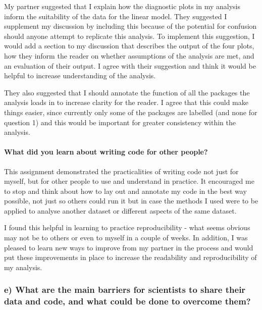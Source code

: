 \documentclass[
]{article}
\begin{document}
My partner suggested that I explain how the diagnostic plots in my
analysis inform the suitability of the data for the linear model. They
suggested I supplement my discussion by including this because of the
potential for confusion should anyone attempt to replicate this
analysis. To implement this suggestion, I would add a section to my
discussion that describes the output of the four plots, how they inform
the reader on whether assumptions of the analysis are met, and an
evaluation of their output. I agree with their suggestion and think it
would be helpful to increase understanding of the analysis.

They also suggested that I should annotate the function of all the
packages the analysis loads in to increase clarity for the reader. I
agree that this could make things easier, since currently only some of
the packages are labelled (and none for question 1) and this would be
important for greater consistency within the analysis.

\paragraph{What did you learn about writing code for other
people?}\label{what-did-you-learn-about-writing-code-for-other-people}

This assignment demonstrated the practicalities of writing code not just
for myself, but for other people to use and understand in practice. It
encouraged me to stop and think about how to lay out and annotate my
code in the best way possible, not just so others could run it but in
case the methods I used were to be applied to analyse another dataset or
different aspects of the same dataset.

I found this helpful in learning to practice reproducibility - what
seems obvious may not be to others or even to myself in a couple of
weeks. In addition, I was pleased to learn new ways to improve from my
partner in the process and would put these improvements in place to
increase the readability and reproducibility of my analysis.

\subsubsection{e) What are the main barriers for scientists to share
their data and code, and what could be done to overcome
them?}\label{e-what-are-the-main-barriers-for-scientists-to-share-their-data-and-code-and-what-could-be-done-to-overcome-them}
\end{document}
